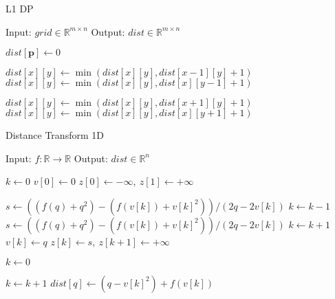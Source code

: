 \documentclass{article}
\begin{document}
\begin{algorithm}
    \caption{L1 DP}
    \begin{algorithmic}[1]
        \STATE Input: $grid \in \mathbb{R}^{m \times n}$
        \STATE Output: $dist \in \mathbb{R}^{m \times n}$

                \STATE $dist[\bm{p}] \gets 0$
            \ENDIF
        \ENDFOR

                \STATE $dist[x][y] \gets \min(dist[x][y], dist[x - 1][y] + 1)$
                \STATE $dist[x][y] \gets \min(dist[x][y], dist[x ][y - 1] + 1)$
            \ENDFOR
        \ENDFOR

                \STATE $dist[x][y] \gets \min(dist[x][y], dist[x + 1][y] + 1)$
                \STATE $dist[x][y] \gets \min(dist[x][y], dist[x ][y + 1] + 1)$
            \ENDFOR
        \ENDFOR
    \end{algorithmic}
\end{algorithm}

\begin{algorithm}
    \caption{Distance Transform 1D}
    \begin{algorithmic}[1]
        \STATE Input: $f: \mathbb{R} \to \mathbb{R}$
        \STATE Output: $dist \in \mathbb{R}^n$

        \STATE $k \gets 0$
        \STATE $v[0] \gets 0$
        \STATE $z[0] \gets -\infty,\ z[1] \gets +\infty$

            \STATE $s \gets ((f(q) + q^2) - (f(v[k]) + v[k]^2)) / (2q-2v[k])$
                \STATE $k \gets k-1$
                \STATE $s \gets ((f(q) + q^2) - (f(v[k]) + v[k]^2)) / (2q-2v[k])$
            \ENDWHILE
            \STATE $k \gets k + 1$
            \STATE $v[k] \gets q$
            \STATE $z[k] \gets s,\ z[k+1] \gets +\infty$
        \ENDFOR

        \STATE $k \gets 0$

                \STATE $k \gets k+1$
            \ENDWHILE
            \STATE $dist[q] \gets (q-v[k]^2) + f(v[k])$
        \ENDFOR
    \end{algorithmic}
\end{algorithm}
\end{document}
